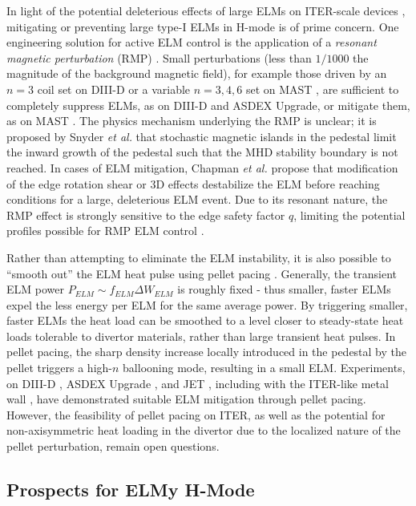 In light of the potential deleterious effects of large ELMs on ITER-scale devices \cite{Loarte2003,Federici2003}, mitigating or preventing large type-I ELMs in H-mode is of prime concern.  One engineering solution for active ELM control is the application of a \emph{resonant magnetic perturbation} (RMP) \cite{Evans2004,Moyer2005,Evans2006}.  Small perturbations (less than $1/1000$ the magnitude of the background magnetic field), for example those driven by an $n=3$ coil set on DIII-D \cite{Evans2004} or a variable $n=3,4,6$ set on MAST \cite{Kirk2013}, are sufficient to completely suppress ELMs, as on DIII-D and ASDEX Upgrade, or mitigate them, as on MAST \cite{Kirk2013}.  The physics mechanism underlying the RMP is unclear; it is proposed by Snyder \emph{et al.} \cite{Snyder2012} that stochastic magnetic islands in the pedestal limit the inward growth of the pedestal such that the MHD stability boundary is not reached.  In cases of ELM mitigation, Chapman \emph{et al.} \cite{Chapman2012} propose that modification of the edge rotation shear or 3D effects destabilize the ELM before reaching conditions for a large, deleterious ELM event.  Due to its resonant nature, the RMP effect is strongly sensitive to the edge safety factor $q$, limiting the potential profiles possible for RMP ELM control \cite{Moyer2005}.

Rather than attempting to eliminate the ELM instability, it is also possible to ``smooth out'' the ELM heat pulse using pellet pacing \cite{Baylor2013}.  Generally, the transient ELM power $P_{ELM} \sim f_{ELM} \Delta W_{ELM}$ is roughly fixed - thus smaller, faster ELMs expel the less energy per ELM for the same average power.  By triggering smaller, faster ELMs the heat load can be smoothed to a level closer to steady-state heat loads tolerable to divertor materials, rather than large transient heat pulses.  In pellet pacing, the sharp density increase locally introduced in the pedestal by the pellet triggers a high-$n$ ballooning mode, resulting in a small ELM.  Experiments, \eg on DIII-D \cite{Baylor2013}, ASDEX Upgrade \cite{Lang2014}, and JET \cite{Lang2011}, including with the ITER-like metal wall \cite{Lang2013}, have demonstrated suitable ELM mitigation through pellet pacing.  However, the feasibility of pellet pacing on ITER, as well as the potential for non-axisymmetric heat loading in the divertor due to the localized nature of the pellet perturbation, remain open questions.

\subsection{Prospects for ELMy H-Mode}\label{subsec:hcr_elmy_prospects}


